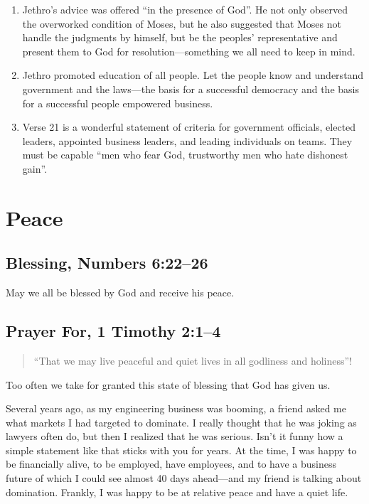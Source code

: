 \documentclass[12pt]{memoir}
\begin{document}
\begin{enumerate}
\item Jethro's advice was offered ``in the presence of God''. He not only observed the overworked condition of Moses, but he also suggested that Moses not handle the judgments by himself, but be the peoples' representative and present them to God for resolution---something we all need to keep in mind.

\item Jethro promoted education of all people. Let the people know and understand government and the laws---the basis for a successful democracy and
the basis for a successful people empowered business.

\item Verse  21 is a wonderful statement of criteria for government officials, elected leaders, appointed business leaders, and leading individuals on teams. They must be capable ``men who fear God, trustworthy men who hate dishonest gain''. 
\end{enumerate}

\section{Peace}

\subsection[A Blessing]{Blessing, Numbers 6:22--26}

May we all be blessed by God and receive his peace.

\subsection[Prayer For]{Prayer For, 1 Timothy 2:1--4}

\begin{quote}
``That we may live peaceful and quiet lives in all godliness and holiness''! 
\end{quote}

Too often we take for granted this state of blessing that God has
given us.

Several years ago, as my engineering business was booming, a friend
asked me what markets I had targeted to dominate. I really thought
that he was joking as lawyers often do, but then I realized that he
was serious. Isn't it funny how a simple statement like that sticks
with you for years. At the time, I was happy to be financially alive,
to be employed, have employees, and to have a business future of
which I could see almost 40 days ahead---and my friend is talking
about domination. Frankly, I was happy to be at relative peace
and have a quiet life.
\end{document}
